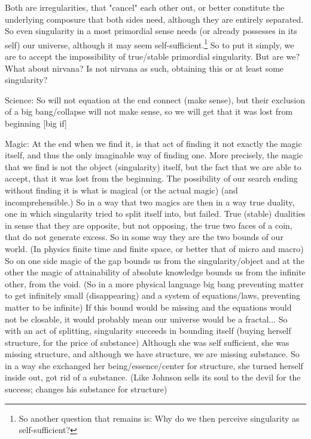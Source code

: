 \documentclass[10pt]{book}
\begin{document}
Both are irregularities, that "cancel" each other out, or better constitute the underlying composure that both sides need, although they are entirely separated.
So even singularity in a most primordial sense needs (or already possesses in its self) our universe, although it may seem self-sufficient.\footnote{So another question that remains is: Why do we then perceive singularity as self-sufficient?} So to put it simply, we are to accept the impossibility of true/stable primordial singularity. But are we? What about nirvana? Is not nirvana as such, obtaining this or at least some singularity?

Science:
So will not equation at the end connect (make sense), but their exclusion of a big bang/collapse will not make sense, so we will get that it was lost from beginning [big if]

Magic:
At the end when we find it, is that act of finding it not exactly the magic itself, and thus the only imaginable way of finding one. More precisely, the magic that we find is not the object (singularity) itself, but the fact that we are able to accept, that it was lost from the beginning. The possibility of our search ending without finding it is what is magical (or the actual magic) (and incomprehensible.)
So in a way that two magics are then in a way true duality, one in which singularity tried to split itself into, but failed. True (stable) dualities in sense that they are opposite, but not opposing, the true two faces of a coin, that do not generate excess. So in some way they are the two bounds of our world. (In physics finite time and finite space, or better that of micro and macro) So on one side magic of the gap bounds us from the singularity/object and at the other the magic of attainability of absolute knowledge bounds us from the infinite other, from the void. (So in a more physical language big bang preventing matter to get infinitely small (disappearing) and a system of equations/laws, preventing matter to be infinite) If this bound would be missing and the equations would not be closable, it would probably mean our universe would be a fractal...
So with an act of splitting, singularity succeeds in bounding itself (buying herself structure, for the price of substance) Although she was self sufficient, she was missing structure, and although we have structure, we are missing substance. So in a way she exchanged her being/essence/center for structure, she turned herself inside out, got rid of a substance. (Like Johnson sells its soul to the devil for the success; changes his substance for structure)
\end{document}
